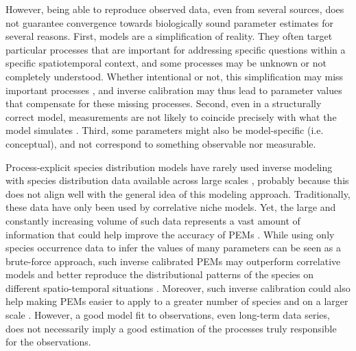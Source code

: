 \documentclass[preprint,12pt,authoryear]{elsarticle}
\begin{document}
However, being able to reproduce observed data, even from several sources, does not guarantee convergence towards biologically sound parameter estimates for several reasons. First, models are a simplification of reality. They often target particular processes that are important for addressing specific questions within a specific spatiotemporal context, and some processes may be unknown or not completely understood. Whether intentional or not, this simplification may miss important processes \citep{Forrester2021}, and inverse calibration may thus lead to parameter values that compensate for these missing processes. Second, even in a structurally correct model, measurements are not likely to coincide precisely with what the model simulates \citep{Zhang2024}. Third, some parameters might also be model-specific (i.e. conceptual), and not correspond to something observable nor measurable.

Process-explicit species distribution models have rarely used inverse modeling with species distribution data available across large scales \citep{Pagel2011, Higgins2012, VanderMeersch2023}, probably because this does not align well with the general idea of this modeling approach. Traditionally, these data have only been used by correlative niche models. Yet, the large and constantly increasing volume of such data \citep{Feng2022} represents a vast amount of information that could help improve the accuracy of PEMs \citep{Evans2016}. While using only species occurrence data to infer the values of many parameters can be seen as a brute-force approach, such inverse calibrated PEMs may outperform correlative models and better reproduce the distributional patterns of the species on different spatio-temporal situations \citep{Higgins2020, VanderMeersch2025}.  Moreover, such inverse calibration could also help making PEMs easier to apply to a greater number of species and on a larger scale \citep[e.g.][]{Conradi2024}. However, a good model fit to observations, even long-term data series, does not necessarily imply a good estimation of the processes truly responsible for the observations. 
\end{document}
